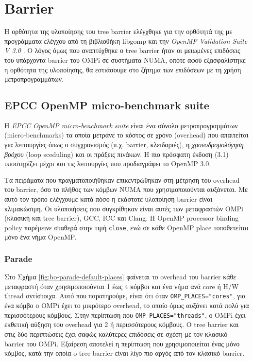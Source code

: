\section{Barrier}
\label{sec:exp-barrier}
Η ορθότητα της υλοποίησης του tree barrier ελέγχθηκε για την ορθότητά της με προγράμματα ελέγχου από τη βιβλιοθήκη libgomp και την \textit{OpenMP Validation Suite V 3.0} \cite{wang2012openmp, ompvalsuite3}. Ο λόγος όμως που αναπτύχθηκε ο tree barrier ήταν οι μειωμένες επιδόσεις του υπάρχοντα barrier του OMPi σε συστήματα NUMA, οπότε αφού εξασφαλίστηκε η ορθότητα της υλοποίησης, θα εστιάσουμε στο ζήτημα των επιδόσεων με τη χρήση μετροπρογραμμάτων.

\subsection{EPCC OpenMP micro-benchmark suite}
Η \textit{EPCC OpenMP micro-benchmark suite} \cite{bull1999measuring} είναι ένα σύνολο μετροπρογραμμάτων (micro-benchmarks) τα οποία μετράνε το κόστος σε χρόνο (overhead) που απαιτείται για λειτουργίες όπως ο συγχρονισμός (π.χ. barrier, κλειδαριές), η \textit{χρονοδρομολόγηση βρόχου} (loop sceduling) και οι πράξεις πινάκων. Η πιο πρόσφατη έκδοση (3.1) υποστηρίζει μέχρι και τις λειτουργίες που προδιαγράφει το OpenMP 3.0.

Τα πειράματα που πραγματοποιήθηκαν επικεντρώθηκαν στη μέτρηση του overhead του barrier, όσο το πλήθος των κόμβων NUMA που χρησιμοποιούνται αυξάνεται. Με αυτό τον τρόπο ελέγχουμε κατά πόσο η εκάστοτε υλοποίηση barrier είναι κλιμακώσιμη. Οι υλοποιήσεις που συγκρίθηκαν είναι αυτές των μεταφραστών OMPi (κλασική και tree barrier), GCC, ICC και Clang. Η OpenMP processor binding policy παρέμεινε σταθερά στην τιμή \texttt{close}, ενώ σε κάθε OpenMP place τοποθετείται μόνο ένα νήμα OpenMP.


\subsubsection{Parade}
Στο Σχήμα \ref{fig:bo-parade-default-places} φαίνεται το overhead του barrier κάθε μεταφραστή όταν χρησιμοποιούνται 1 έως 4 κόμβοι και ένα νήμα ανά core ή H/W thread αντίστοιχα. Αυτό που παρατηρούμε, είναι ότι όταν \texttt{OMP\_PLACES="cores"}, για ένα κόμβο ο OMPi έχει το μικρότερο overhead, το οποίο όμως αυξάνει κατά πολύ για περισσότερους κόμβους. Στην περίπτωση που \texttt{OMP\_PLACES="threads"}, ο OMPi έχει εκθετική αύξηση του overhead για 2 ή περισσότερους κόμβους. Ο tree barrier και στις δύο περιπτώσεις έχει σαφώς καλύτερες επιδόσεις σε σχέση με τον κλασικό barrier του OMPi. Εξαίρεση αποτελεί η περίπτωση που χρησιμοποιείται ένας μόνο κόμβος, κατά την οποία o tree barrier είναι λίγο πιο αργός από τον κλασικό barrier. %

